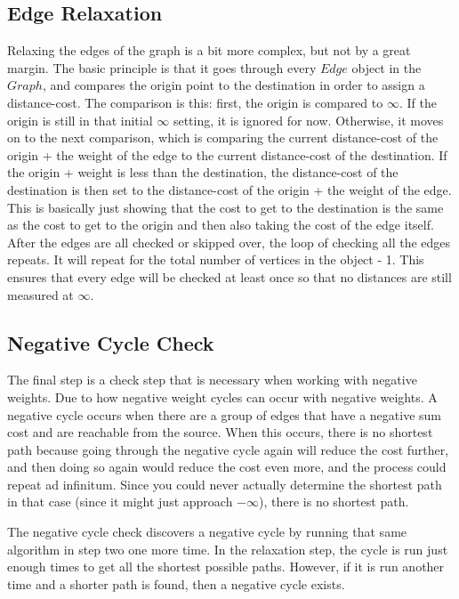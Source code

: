 \documentclass[letterpaper, 10pt,DIV=13]{scrartcl}
\numberwithin{equation}{section} %
\numberwithin{figure}{section} %
\numberwithin{table}{section} %
\begin{document}
\subsection{Edge Relaxation}
Relaxing the edges of the graph is a bit more complex, but not by a great margin. The basic principle is that it goes through every $Edge$ object in the $Graph$, and compares the origin point to the destination in order to assign a distance-cost. The comparison is this: first, the origin is compared to $\infty$. If the origin is still in that initial $\infty$ setting, it is ignored for now. Otherwise, it moves on to the next comparison, which is comparing the current distance-cost of the origin + the weight of the edge to the current distance-cost of the destination. If the origin + weight is less than the destination, the distance-cost of the destination is then set to the distance-cost of the origin + the weight of the edge. This is basically just showing that the cost to get to the destination is the same as the cost to get to the origin and then also taking the cost of the edge itself. After the edges are all checked or skipped over, the loop of checking all the edges repeats. It will repeat for the total number of vertices in the object - 1. This ensures that every edge will be checked at least once so that no distances are still measured at $\infty$.

\subsection{Negative Cycle Check}
The final step is a check step that is necessary when working with negative weights. Due to how negative weight cycles can occur with negative weights. A negative cycle occurs when there are a group of edges that have a negative sum cost and are reachable from the source. When this occurs, there is no shortest path because going through the negative cycle again will reduce the cost further, and then doing so again would reduce the cost even more, and the process could repeat ad infinitum. Since you could never actually determine the shortest path in that case (since it might just approach $-\infty$), there is no shortest path.

The negative cycle check discovers a negative cycle by running that same algorithm in step two one more time. In the relaxation step, the cycle is run just enough times to get all the shortest possible paths. However, if it is run another time and a shorter path is found, then a negative cycle exists.
\end{document}
